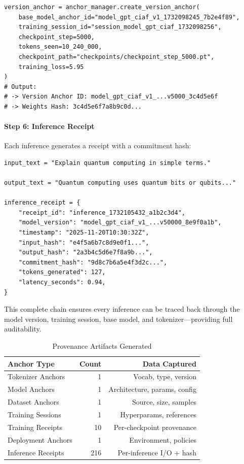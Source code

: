 \documentclass[11pt,a4paper]{article}
\begin{document}
\begin{lstlisting}[style=ciafpython, backgroundcolor=\color{cyan!5}]
version_anchor = anchor_manager.create_version_anchor(
    base_model_anchor_id="model_gpt_ciaf_v1_1732098245_7b2e4f89",
    training_session_id="session_model_gpt_ciaf_1732098256",
    checkpoint_step=5000,
    tokens_seen=10_240_000,
    checkpoint_path="checkpoints/checkpoint_step_5000.pt",
    training_loss=5.95
)
# Output:
# -> Version Anchor ID: model_gpt_ciaf_v1_...v5000_3c4d5e6f
# -> Weights Hash: 3c4d5e6f7a8b9c0d...
\end{lstlisting}

\paragraph{Step 6: Inference Receipt}
 
Each inference generates a receipt with a commitment hash:
\begin{lstlisting}[style=ciafpython, backgroundcolor=\color{yellow!10}]
input_text = "Explain quantum computing in simple terms."

output_text = "Quantum computing uses quantum bits or qubits..."

inference_receipt = {
    "receipt_id": "inference_1732105432_a1b2c3d4",
    "model_version": "model_gpt_ciaf_v1_...v50000_8e9f0a1b",
    "timestamp": "2025-11-20T10:30:32Z",
    "input_hash": "e4f5a6b7c8d9e0f1...",
    "output_hash": "2a3b4c5d6e7f8a9b...",
    "commitment_hash": "9d8c7b6a5e4f3d2c...",
    "tokens_generated": 127,
    "latency_seconds": 0.94,
}
\end{lstlisting}

This complete chain ensures every inference can be traced back through the model version, training session, base model, and tokenizer—providing full auditability.

\begin{table}[H]
\centering
\begin{tabular}{lrr}
\toprule
\textbf{Anchor Type} & \textbf{Count} & \textbf{Data Captured} \\
\midrule
Tokenizer Anchors & 1 & Vocab, type, version \\
Model Anchors & 1 & Architecture, params, config \\
Dataset Anchors & 1 & Source, size, samples \\
Training Sessions & 1 & Hyperparams, references \\
Training Receipts & 10 & Per-checkpoint provenance \\
Deployment Anchors & 1 & Environment, policies \\
Inference Receipts & 216 & Per-inference I/O + hash \\
\bottomrule
\end{tabular}
\caption{Provenance Artifacts Generated}
\label{tab:provenance}
\end{table}
\end{document}
